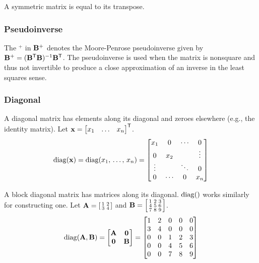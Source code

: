 A symmetric matrix is equal to its transpose.

\subsubsection{Pseudoinverse}
The $^+$ in $\mathbf{B}^+$ denotes the Moore-Penrose pseudoinverse given by
$\mathbf{B}^+ = (\mathbf{B}^\mathsf{T}\mathbf{B})^{-1}\mathbf{B}^\mathsf{T}$. The pseudoinverse is used when
the matrix is nonsquare and thus not invertible to produce a close approximation
of an inverse in the least squares sense.

\subsubsection{Diagonal}
A diagonal matrix has elements along its diagonal and zeroes elsewhere (e.g.,
the identity matrix). Let
$\mathbf{x} = \begin{bmatrix}x_1 & \ldots & x_n\end{bmatrix}^\mathsf{T}$.
\begin{equation*}
  \operatorname{diag}(\mathbf{x}) = \operatorname{diag}(x_1,\, \ldots,\, x_n) =
  \begin{bmatrix}
    x_1 & 0 & \cdots & 0 \\
    0 & x_2 & & \vdots \\
    \vdots & & \ddots & 0 \\
    0 & \cdots & 0 & x_n
  \end{bmatrix}
\end{equation*}

A block diagonal matrix has matrices along its diagonal. $\operatorname{diag}()$ works
similarly for constructing one. Let
$\mathbf{A} = \begin{bsmallmatrix}1 & 2\\3 & 4\end{bsmallmatrix}$ and
$\mathbf{B} = \begin{bsmallmatrix}1 & 2 & 3\\4 & 5 & 6\\7 & 8 & 9\end{bsmallmatrix}$.
\begin{equation*}
  \operatorname{diag}(\mathbf{A}, \mathbf{B}) =
  \begin{bmatrix}
    \mathbf{A} & \mathbf{0} \\
    \mathbf{0} & \mathbf{B}
  \end{bmatrix} =
  \begin{bmatrix}
    1 & 2 & 0 & 0 & 0 \\
    3 & 4 & 0 & 0 & 0 \\
    0 & 0 & 1 & 2 & 3 \\
    0 & 0 & 4 & 5 & 6 \\
    0 & 0 & 7 & 8 & 9
  \end{bmatrix}
\end{equation*}

